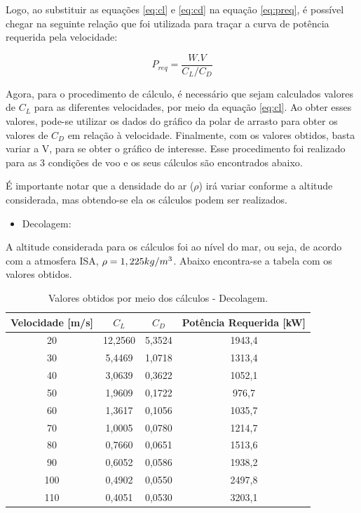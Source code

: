 Logo, ao substituir as equações \ref{eq:cl} e \ref{eq:cd} na equação \ref{eq:preq}, é possível chegar na seguinte relação que foi utilizada para traçar a curva de potência requerida pela velocidade:

\begin{equation}
P_{req} = \frac{W.V}{C_L/C_D}
\label{eq:preq2}
\end{equation}

Agora, para o procedimento de cálculo, é necessário que sejam calculados valores de $C_L$ para as diferentes velocidades, por meio da equação \ref{eq:cl}. Ao obter esses valores, pode-se utilizar os dados do gráfico da polar de arrasto para obter os valores de $C_D$ em relação à velocidade. Finalmente, com os valores obtidos, basta variar a V, para se obter o gráfico de interesse. Esse procedimento foi realizado para as 3 condições de voo e os seus cálculos são encontrados abaixo.

É importante notar que a densidade do ar ($\rho$) irá variar conforme a altitude considerada, mas obtendo-se ela os cálculos podem ser realizados.

\begin{itemize}
    \item{Decolagem:}
\end{itemize}

A altitude considerada para os cálculos foi ao nível do mar, ou seja, de acordo com a atmosfera ISA, $\rho = 1,225 \space kg/m^3$. Abaixo encontra-se a tabela com os valores obtidos.


\begin{table}[H]
\centering
\caption{Valores obtidos por meio dos cálculos - Decolagem.}
\begin{tabular}{c c c c}
\hline
Velocidade [m/s] & $C_L$ & $C_D$ & Potência Requerida [kW] \\
\hline
20 & 12{,}2560 & 5{,}3524 & 1943{,}4 \\
30 & 5{,}4469 & 1{,}0718 & 1313{,}4 \\
40 & 3{,}0639 & 0{,}3622 & 1052{,}1 \\
50 & 1{,}9609 & 0{,}1722 & 976{,}7 \\
60 & 1{,}3617 & 0{,}1056 & 1035{,}7 \\
70 & 1{,}0005 & 0{,}0780 & 1214{,}7 \\
80 & 0{,}7660 & 0{,}0651 & 1513{,}6 \\
90 & 0{,}6052 & 0{,}0586 & 1938{,}2 \\
100 & 0{,}4902 & 0{,}0550 & 2497{,}8 \\
110 & 0{,}4051 & 0{,}0530 & 3203{,}1 \\
\hline
\end{tabular}
\end{table}


